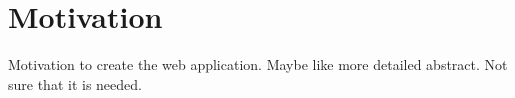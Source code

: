 \section{Motivation}
\label{sec-motivation}

Motivation to create the web application. Maybe like more detailed abstract.
Not sure that it is needed.

